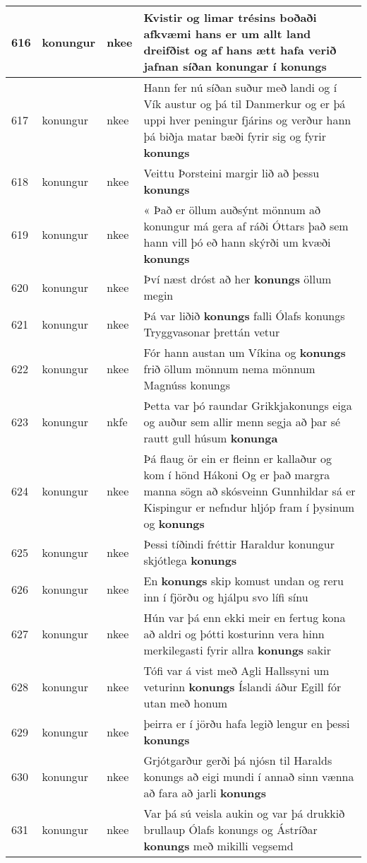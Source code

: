 \documentclass{article}
\begin{document}
\begin{longtable}{p{1cm}|p{1cm}|p{1cm}|p{13cm}}
\hline
616&konungur&nkee&Kvistir og limar trésins boðaði afkvæmi hans er um allt land dreifðist og af hans ætt hafa verið jafnan síðan konungar í \textbf{konungs} \\
\hline
617&konungur&nkee&Hann fer nú síðan suður með landi og í Vík austur og þá til Danmerkur og er þá uppi hver peningur fjárins og verður hann þá biðja matar bæði fyrir sig og fyrir \textbf{konungs} \\
\hline
618&konungur&nkee&Veittu Þorsteini margir lið að þessu \textbf{konungs} \\
\hline
619&konungur&nkee&« Það er öllum auðsýnt mönnum að konungur má gera af ráði Óttars það sem hann vill þó eð hann skýrði um kvæði \textbf{konungs} \\
\hline
620&konungur&nkee&Því næst dróst að her \textbf{konungs} öllum megin\\
\hline
621&konungur&nkee&Þá var liðið \textbf{konungs} falli Ólafs konungs Tryggvasonar þrettán vetur\\
\hline
622&konungur&nkee&Fór hann austan um Víkina og \textbf{konungs} frið öllum mönnum nema mönnum Magnúss konungs\\
\hline
623&konungur&nkfe&Þetta var þó raundar Grikkjakonungs eiga og auður sem allir menn segja að þar sé rautt gull húsum \textbf{konunga} \\
\hline
624&konungur&nkee&Þá flaug ör ein er fleinn er kallaður og kom í hönd Hákoni Og er það margra manna sögn að skósveinn Gunnhildar sá er Kispingur er nefndur hljóp fram í þysinum og \textbf{konungs} \\
\hline
625&konungur&nkee&Þessi tíðindi fréttir Haraldur konungur skjótlega \textbf{konungs} \\
\hline
626&konungur&nkee&En \textbf{konungs} skip komust undan og reru inn í fjörðu og hjálpu svo lífi sínu\\
\hline
627&konungur&nkee&Hún var þá enn ekki meir en fertug kona að aldri og þótti kosturinn vera hinn merkilegasti fyrir allra \textbf{konungs} sakir\\
\hline
628&konungur&nkee&Tófi var á vist með Agli Hallssyni um veturinn \textbf{konungs} Íslandi áður Egill fór utan með honum\\
\hline
629&konungur&nkee&þeirra er í jörðu hafa legið lengur en þessi \textbf{konungs} \\
\hline
630&konungur&nkee&Grjótgarður gerði þá njósn til Haralds konungs að eigi mundi í annað sinn vænna að fara að jarli \textbf{konungs} \\
\hline
631&konungur&nkee&Var þá sú veisla aukin og var þá drukkið brullaup Ólafs konungs og Ástríðar \textbf{konungs} með mikilli vegsemd\\

\end{longtable}
\end{document}
